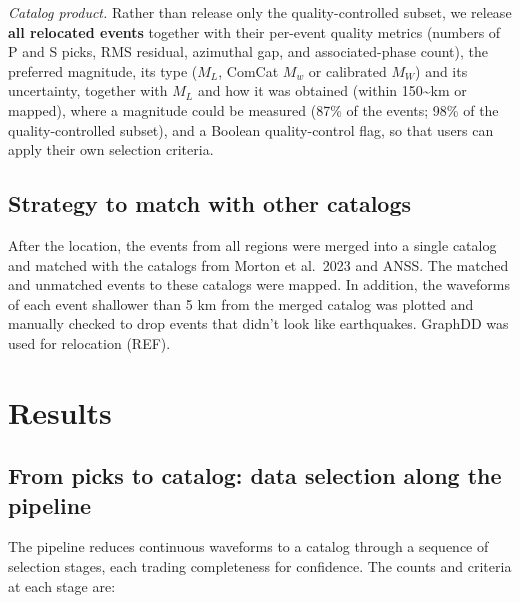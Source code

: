 \documentclass[review]{seismica}
\begin{document}
\emph{Catalog product.} Rather than release only the quality-controlled
subset, we release \textbf{all relocated events} together with their
per-event quality metrics (numbers of P and S picks, RMS residual,
azimuthal gap, and associated-phase count), the preferred magnitude, its
type (\(M_L\), ComCat \(M_w\) or calibrated \(M_W\)) and its
uncertainty, together with \(M_L\) and how it was obtained (within
150\textasciitilde km or mapped), where a magnitude could be measured
(87\% of the events; 98\% of the quality-controlled subset), and a
Boolean quality-control flag, so that users can apply their own
selection criteria.

\subsection{Strategy to match with other
catalogs}\label{strategy-to-match-with-other-catalogs}

After the location, the events from all regions were merged into a
single catalog and matched with the catalogs from Morton et al.~2023 and
ANSS. The matched and unmatched events to these catalogs were mapped. In
addition, the waveforms of each event shallower than 5 km from the
merged catalog was plotted and manually checked to drop events that
didn't look like earthquakes. GraphDD was used for relocation (REF).

\section{Results}\label{sec:results}

\subsection{From picks to catalog: data selection along the
pipeline}\label{from-picks-to-catalog-data-selection-along-the-pipeline}

The pipeline reduces continuous waveforms to a catalog through a
sequence of selection stages, each trading completeness for confidence.
The counts and criteria at each stage are:
\end{document}
